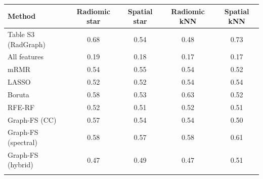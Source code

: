 \begin{tabular}{@{}lcccc@{}}
\toprule
Method & Radiomic star & Spatial star & Radiomic kNN & Spatial kNN \\
\midrule
Table S3 (RadGraph) & 0.68 & 0.54 & 0.48 & 0.73 \\
All features & 0.19 & 0.18 & 0.17 & 0.17 \\
mRMR & 0.54 & 0.55 & 0.54 & 0.52 \\
LASSO & 0.52 & 0.52 & 0.54 & 0.54 \\
Boruta & 0.58 & 0.53 & 0.63 & 0.52 \\
RFE-RF & 0.52 & 0.51 & 0.52 & 0.51 \\
Graph-FS (CC) & 0.57 & 0.54 & 0.54 & 0.50 \\
Graph-FS (spectral) & 0.58 & 0.57 & 0.58 & 0.61 \\
Graph-FS (hybrid) & 0.47 & 0.49 & 0.47 & 0.51 \\
\botrule
\end{tabular}
